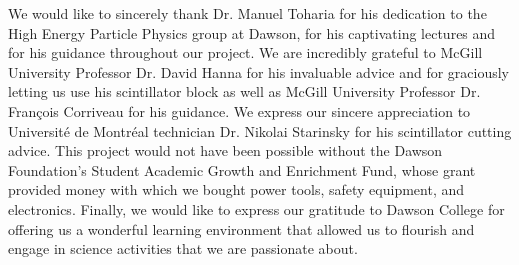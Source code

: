 We would like to sincerely thank Dr. Manuel Toharia for his dedication to the High Energy Particle Physics group at Dawson, for his captivating lectures and for his guidance throughout our project. We are incredibly grateful to McGill University Professor Dr. David Hanna for his invaluable advice and for graciously letting us use his scintillator block as well as McGill University Professor Dr. François Corriveau for his guidance. We express our sincere appreciation to Université de Montréal technician Dr. Nikolai Starinsky for his scintillator cutting advice. This project would not have been possible without the Dawson Foundation’s Student Academic Growth and Enrichment Fund, whose grant provided money with which we bought power tools, safety equipment, and electronics. Finally, we would like to express our gratitude to Dawson College for offering us a wonderful learning environment that allowed us to flourish and engage in science activities that we are passionate about. 
